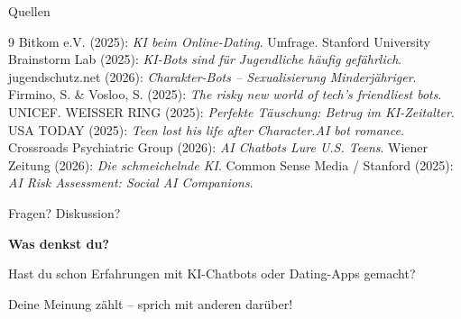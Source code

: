\documentclass[10pt,aspectratio=169]{beamer}
\begin{document}
	\begin{frame}{Quellen}
		\small
		\begin{thebibliography}{9}
			 Bitkom e.V. (2025): \emph{KI beim Online-Dating}. Umfrage.
			 Stanford University Brainstorm Lab (2025): \emph{KI-Bots sind für Jugendliche häufig gefährlich}.
			 jugendschutz.net (2026): \emph{Charakter-Bots – Sexualisierung Minderjähriger}.
			 Firmino, S. \& Vosloo, S. (2025): \emph{The risky new world of tech's friendliest bots}. UNICEF.
			 WEISSER RING (2025): \emph{Perfekte Täuschung: Betrug im KI-Zeitalter}.
			 USA TODAY (2025): \emph{Teen lost his life after Character.AI bot romance}.
			 Crossroads Psychiatric Group (2026): \emph{AI Chatbots Lure U.S. Teens}.
			 Wiener Zeitung (2026): \emph{Die schmeichelnde KI}.
			 Common Sense Media / Stanford (2025): \emph{AI Risk Assessment: Social AI Companions}.
		\end{thebibliography}
	\end{frame}
	
	\begin{frame}{Fragen? Diskussion?}
		\begin{center}
			\LARGE \textbf{Was denkst du?}
			
			\vspace{1cm}
			\large Hast du schon Erfahrungen mit KI-Chatbots oder Dating-Apps gemacht?
			
			\vspace{1cm}
			\alert{Deine Meinung zählt – sprich mit anderen darüber!}
		\end{center}
	\end{frame}
	
\end{document}
